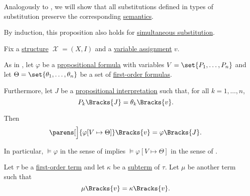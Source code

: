 \begin{proposition}\label{thm:first_order_substitution_equivalence}
  Analogously to , we will show that all substitutions defined in  types of substitution preserve the corresponding \hyperref[def:first_order_semantics]{semantics}.

  By induction, this proposition also holds for \hyperref[def:propositional_substitution/simultaneous]{simultaneous substitution}.

  Fix a \hyperref[def:first_order_structure]{structure} \( \mscrX = (X, I) \) and a \hyperref[def:first_order_valuation/variable_assignment]{variable assignment} \( v \).

  \begin{thmenum}
     As in , let \( \varphi \) be a \hyperref[def:propositional_syntax/formula]{propositional formula} with variables \( {V = \set{ P_1, \ldots, P_n }} \) and let \( \Theta = \set{ \theta_1, \ldots, \theta_n } \) be a set of \hyperref[def:first_order_syntax/formula]{first-order formulas}.

    Furthermore, let \( J \) be a \hyperref[def:propositional_valuation/interpretation]{propositional interpretation} such that, for all \( k = 1, \ldots, n \),
    \begin{equation}\label{eq:thm:first_order_substitution_equivalence/propositional/compatibility}
      P_k\Bracks{J} = \theta_k\Bracks{v}.
    \end{equation}

    Then
    \begin{equation}\label{eq:thm:first_order_substitution_equivalence/propositional}
      \parens[\Big]{ \varphi[V \mapsto \Theta] }\Bracks{v} = \varphi \Bracks{J}.
    \end{equation}

    In particular, \( \vDash \varphi \) in the sense of  implies \( \vDash \varphi[V \mapsto \Theta] \) in the sense of .

     Let \( \tau \) be a \hyperref[def:first_order_syntax/term]{first-order term} and let \( \kappa \) be a \hyperref[def:first_order_syntax/subterm]{subterm} of \( \tau \). Let \( \mu \) be another term such that
    \begin{equation}\label{eq:thm:first_order_substitution_equivalence/term_in_term/compatibility}
      \mu\Bracks{v} = \kappa\Bracks{v}.
    \end{equation}


\end{thmenum}
\end{proposition}
